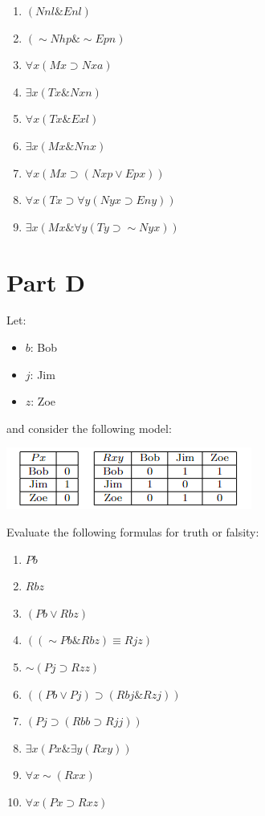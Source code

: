 \documentclass[
]{book}
\providecommand{\tightlist}{%
  \setlength{\itemsep}{0pt}\setlength{\parskip}{0pt}}
\begin{document}
\begin{enumerate}
\def\labelenumi{\arabic{enumi}.}
\tightlist
\item
  \((Nnl \& Enl)\)
\item
  \((\sim Nhp \& \sim Epn)\)
\item
  \(\forall x(Mx \supset Nxa)\)
\item
  \(\exists x(Tx \& Nxn)\)
\item
  \(\forall x(Tx \& Exl)\)
\item
  \(\exists x(Mx \& Nnx)\)
\item
  \(\forall x(Mx \supset (Nxp \lor Epx))\)
\item
  \(\forall x(Tx \supset \forall y( Nyx \supset Eny))\)
\item
  \(\exists x(Mx \& \forall y(Ty \supset \sim Nyx))\)
\end{enumerate}

\hypertarget{part-d}{%
\section{Part D}\label{part-d}}

Let:

\begin{itemize}
\tightlist
\item
  \(b\): Bob
\item
  \(j\): Jim
\item
  \(z\): Zoe
\end{itemize}

and consider the following model:

\includegraphics{Pictures/Week8.png}

Evaluate the following formulas for truth or falsity:

\begin{enumerate}
\def\labelenumi{\arabic{enumi}.}
\tightlist
\item
  \(Pb\)
\item
  \(Rbz\)
\item
  \((Pb \lor Rbz)\)
\item
  \(((\sim Pb \& Rbz) \equiv Rjz)\)
\item
  \(\sim (Pj \supset Rzz)\)
\item
  \(((Pb \lor Pj) \supset (Rbj \& Rzj))\)
\item
  \((Pj \supset (Rbb \supset Rjj))\)
\item
  \(\exists x(Px \& \exists y (Rxy))\)
\item
  \(\forall x \sim (Rxx)\)
\item
  \(\forall x (Px \supset Rxz)\)
\end{enumerate}
\end{document}
